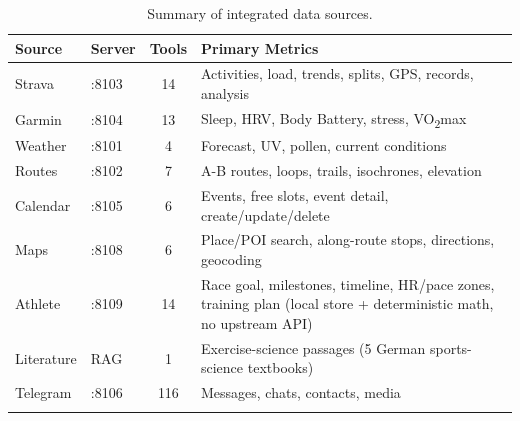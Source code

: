 \begin{table}[ht]
\begin{center}
\begin{minipage}{\textwidth}
\caption[Summary of integrated data sources]{Summary of integrated data sources.}\label{tab:data_summary}
\begin{tabularx}{\textwidth}{llcX}
\toprule
\textbf{Source} & \textbf{Server} & \textbf{Tools} & \textbf{Primary Metrics} \\
\midrule
Strava & :8103 & 14 & Activities, load, trends, splits, GPS, records, analysis \\
Garmin & :8104 & 13 & Sleep, HRV, Body Battery, stress, VO\textsubscript{2}max \\
Weather & :8101 & 4 & Forecast, UV, pollen, current conditions \\
Routes & :8102 & 7 & A-B routes, loops, trails, isochrones, elevation \\
Calendar & :8105 & 6 & Events, free slots, event detail, create/update/delete \\
Maps & :8108 & 6 & Place/POI search, along-route stops, directions, geocoding \\
Athlete & :8109 & 14 & Race goal, milestones, timeline, HR/pace zones, training plan (local store + deterministic math, no upstream API) \\
Literature & RAG & 1 & Exercise-science passages (5 German sports-science textbooks) \\
Telegram & :8106 & 116 & Messages, chats, contacts, media \\
\botrule
\end{tabularx}
\end{minipage}
\end{center}
\end{table}
